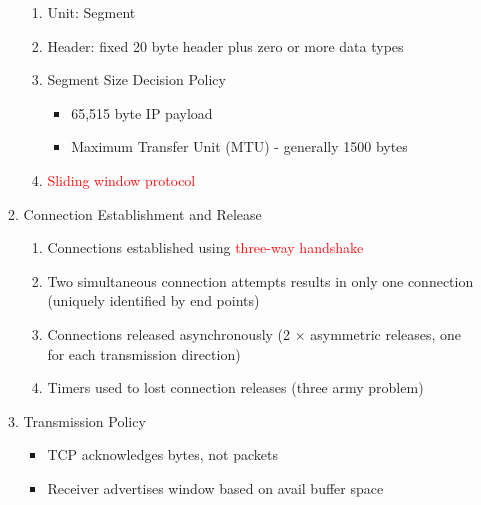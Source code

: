 \documentclass[a4paper,10pt]{article}
\newcommand{\red}[1]{\textcolor{red}{#1}}
\begin{document}
\begin{enumerate}
\begin{enumerate}
\begin{enumerate}
          \item Unit: Segment
          \item Header: fixed 20 byte header plus zero or more data types
          \item Segment Size Decision Policy
            \begin{itemize}
              \item 65,515 byte IP payload
              \item Maximum Transfer Unit (MTU) - generally 1500 bytes
            \end{itemize}
          \item \red{Sliding window protocol}
        \end{enumerate}
      \item Connection Establishment and Release
        \begin{enumerate}
          \item Connections established using \red{three-way handshake}
          \item Two simultaneous connection attempts results in only one connection (uniquely identified by end points)
          \item Connections released asynchronously (2 $\times$ asymmetric releases, one for each transmission direction)
          \item Timers used to lost connection releases (three army problem)
        \end{enumerate}
      \item Transmission Policy
        \begin{itemize}
          \item TCP acknowledges bytes, not packets
          \item Receiver advertises window based on avail buffer space
        \end{itemize}
    \end{enumerate}


\end{enumerate}
\end{document}

